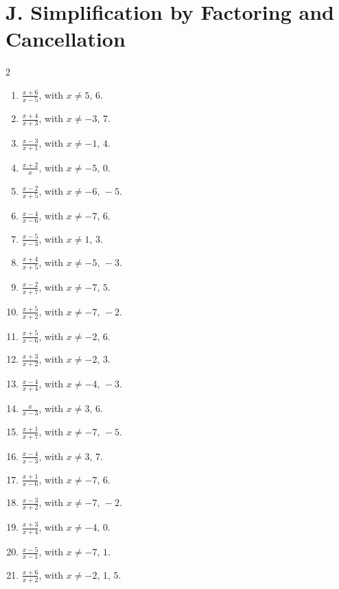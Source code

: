 \documentclass[11pt,oneside]{book}
\begin{document}
\section*{J. Simplification by Factoring and Cancellation}
\begin{multicols}{2}
\begin{enumerate}[leftmargin=*,label=\textbf{J\arabic*.},itemsep=0.45\baselineskip]
\item $\displaystyle \frac{x + 6}{x - 5}$, with $x\ne 5,\,6$.
\item $\displaystyle \frac{x + 4}{x + 3}$, with $x\ne -3,\,7$.
\item $\displaystyle \frac{x - 3}{x + 1}$, with $x\ne -1,\,4$.
\item $\displaystyle \frac{x + 2}{x}$, with $x\ne -5,\,0$.
\item $\displaystyle \frac{x - 2}{x + 5}$, with $x\ne -6,\,-5$.
\item $\displaystyle \frac{x - 4}{x - 6}$, with $x\ne -7,\,6$.
\item $\displaystyle \frac{x - 5}{x - 3}$, with $x\ne 1,\,3$.
\item $\displaystyle \frac{x + 4}{x + 5}$, with $x\ne -5,\,-3$.
\item $\displaystyle \frac{x - 2}{x + 7}$, with $x\ne -7,\,5$.
\item $\displaystyle \frac{x + 5}{x + 2}$, with $x\ne -7,\,-2$.
\item $\displaystyle \frac{x + 5}{x - 6}$, with $x\ne -2,\,6$.
\item $\displaystyle \frac{x + 3}{x + 2}$, with $x\ne -2,\,3$.
\item $\displaystyle \frac{x - 4}{x + 4}$, with $x\ne -4,\,-3$.
\item $\displaystyle \frac{x}{x - 3}$, with $x\ne 3,\,6$.
\item $\displaystyle \frac{x + 1}{x + 7}$, with $x\ne -7,\,-5$.
\item $\displaystyle \frac{x - 4}{x - 3}$, with $x\ne 3,\,7$.
\item $\displaystyle \frac{x + 1}{x - 6}$, with $x\ne -7,\,6$.
\item $\displaystyle \frac{x - 3}{x + 2}$, with $x\ne -7,\,-2$.
\item $\displaystyle \frac{x + 3}{x + 4}$, with $x\ne -4,\,0$.
\item $\displaystyle \frac{x - 5}{x - 1}$, with $x\ne -7,\,1$.
\item $\displaystyle \frac{x + 6}{x + 2}$, with $x\ne -2,\,1,\,5$.

\end{enumerate}
\end{multicols}
\end{document}
